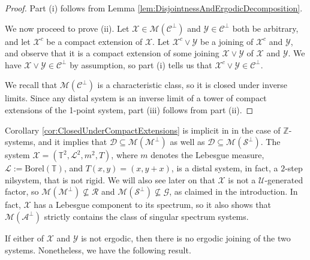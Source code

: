 \documentclass[graybox]{svmult}
\theoremstyle{definition}
\begin{document}
    \begin{proof}
        Part (i) follows from Lemma \ref{lem:DisjointnessAndErgodicDecomposition}.

        We now proceed to prove (ii).
        Let $\mathcal{X} \in \mathscr{M}(\mathscr{C}^\perp)$ and $\mathcal{Y} \in \mathscr{C}^\perp$ both be arbitrary, and let $\mathcal{X}^c$ be a compact extension of $\mathcal{X}$.
        Let $\mathcal{X}^c\vee\mathcal{Y}$ be a joining of $\mathcal{X}^c$ and $\mathcal{Y}$, and observe that it is a compact extension of some joining $\mathcal{X}\vee\mathcal{Y}$ of $\mathcal{X}$ and $\mathcal{Y}$.
        We have $\mathcal{X}\vee\mathcal{Y} \in \mathscr{C}^\perp$ by assumption, so part (i) tells us that $\mathcal{X}^c\vee\mathcal{Y} \in \mathscr{C}^\perp$.

        We recall that $\mathscr{M}(\mathscr{C}^\perp)$ is a characteristic class, so it is closed under inverse limits.
        Since any distal system is an inverse limit of a tower of compact extensions of the 1-point system, part (iii) follows from part (ii).
    \end{proof}

    \begin{remark}\label{rem:DistalIsNotRigidOrParreau}
        Corollary \ref{cor:ClosedUnderCompactExtensions} is implicit in \cite{WPerpAndItsMultipliers} in the case of $\mathbb{Z}$-systems, and it implies that $\mathcal{D} \subseteq \mathscr{M}(\mathcal{M}^\perp)$ as well as $\mathcal{D} \subseteq \mathscr{M}(\mathcal{S}^\perp)$.
        The system $\mathcal{X} = (\mathbb{T}^2,\mathscr{L}^2,m^2,T)$, where $m$ denotes the Lebesgue measure, $\mathscr{L}:=\text{Borel}(\mathbb T)$, and $T(x,y) = (x,y+x)$, is a distal system, in fact, a $2$-step nilsystem, that is not rigid.
        We will also see later on that $\mathcal{X}$ is not a $\mathcal U$-generated factor, so $\mathscr{M}(\mathcal{M}^\perp) \not\subseteq \mathcal{R}$ and $\mathscr{M}(\mathcal{S}^\perp) \not\subseteq \mathcal{G}$, as claimed in the introduction.
        In fact, $\mathcal{X}$ has a Lebesgue component to its spectrum, so it also shows that $\mathscr{M}(\mathcal{A}^\perp)$ strictly contains the class of singular spectrum systems.
    \end{remark}

    If either of $\mathcal{X}$ and $\mathcal{Y}$ is not ergodic, then there is no ergodic joining of the two systems.
    Nonetheless, we have the following result.\\
\end{document}
